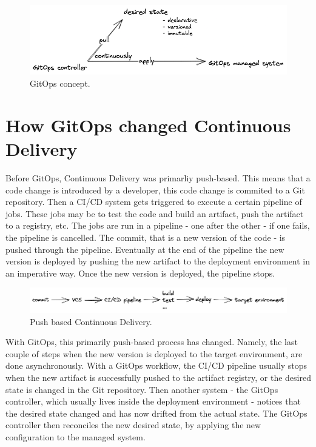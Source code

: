 \begin{figure}[h]
	\centering
	\includegraphics[width=1.00\linewidth]{assets/gitops-concept.png}
	\caption{GitOps concept.
	}
	\label{fig:gitOpsConcept}	
\end{figure}







\section{How GitOps changed Continuous Delivery}

Before GitOps, Continuous Delivery was primarliy push-based.
This means that a code change is introduced by a developer,
this code change is commited to a Git repository.
Then a CI/CD system gets triggered to execute a certain pipeline
of jobs.
These jobs may be to test the code and build an artifact, push the artifact
to a registry, etc.
The jobs are run in a pipeline - one after the other -
if one fails, the pipeline is cancelled.
The commit, that is a new version of the code -
is pushed through the pipeline.
Eventually at the end of the pipeline
the new version is deployed by pushing the new artifact
to the deployment environment in an imperative way.
Once the new version is deployed, the pipeline stops.

\begin{figure}[h]
	\centering
	\includegraphics[width=1.00\linewidth]{assets/push-based-cd.png}
	\caption{Push based Continuous Delivery.
	}
	\label{fig:pushBasedCD}	
\end{figure}

With GitOps, this primarily push-based process has changed.
Namely, the last couple of steps when the new version
is deployed to the target environment,
are done asynchronously.
With a GitOps workflow,
the CI/CD pipeline usually stops when the new artifact
is successfully pushed to the artifact registry,
or the desired state is changed in the Git repository.
Then another system - the GitOps controller,
which usually lives inside the deployment environment -
notices that the desired state changed and has now
drifted from the actual state.
The GitOps controller then reconciles the new desired state,
by applying the new configuration to the managed system.


